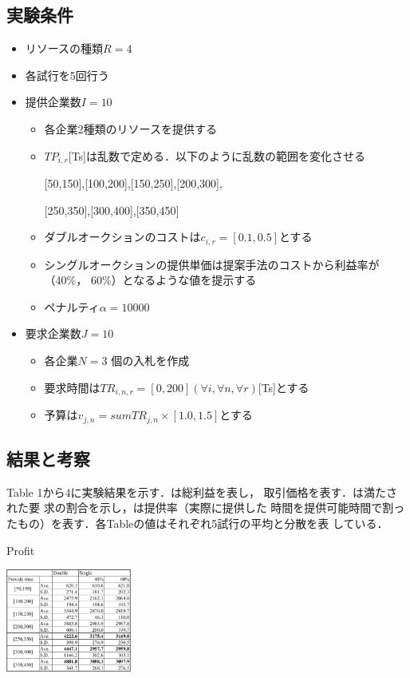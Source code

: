 \documentclass{ujarticle}
\begin{document}
\subsection{実験条件}
\begin{itemize}
  \item {リソースの種類$R=4$}
  \item {各試行を5回行う}
  \item{提供企業数$I=10$}
    \begin{itemize}
    \item {各企業2種類のリソースを提供する} 
    \item {$TP_{i,r}$[Ts]は乱数で定める．以下のように乱数の範囲を変化させる

           [50,150],[100,200],[150,250],[200,300],

           [250,350],[300,400],[350,450]}
    \item {ダブルオークションのコストは$c_{i,r}=[0.1,0.5]$とする}
    \item {シングルオークションの提供単価は提案手法のコストから利益率が（40\%，
        60\%）となるような値を提示する}
    \item {ペナルティ$\alpha=10000$} 
    \end{itemize}
  \item{要求企業数$J=10$}
    \begin{itemize}
    \item {各企業$N=3$ 個の入札を作成}
    \item {要求時間は$TR_{i,n,r}=[0,200](\forall i, \forall n, \forall r)$[Ts]とする} 
    \item {予算は$v_{j,n}=sumTR_{j,n} \times [1.0,1.5]$とする}
    \end{itemize}
\end{itemize}
\subsection{結果と考察}
Table 1から4に実験結果を示す．は総利益を表し，
取引価格を表す．は満たされた要
求の割合を示し，は提供率（実際に提供した
時間を提供可能時間で割ったもの）を表す．各Tableの値はそれぞれ5試行の平均と分散を表
している．\par
\begin{table}[H]
  \caption{Profit}
  \centering
  \includegraphics[width=0.31\textwidth]{profit.pdf} 
  \label{tab:profit}
\end{table}
\end{document}
